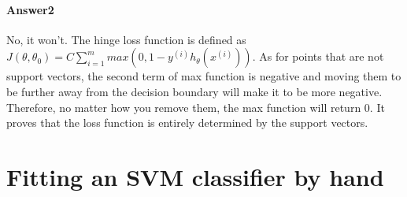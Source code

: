 \documentclass[paper=a4, fontsize=11pt]{scrartcl} %
\numberwithin{equation}{section} %
\numberwithin{figure}{section} %
\numberwithin{table}{section} %
\begin{document}
\paragraph{\textbf{Answer2}}
No, it won't. The hinge loss function is defined as $J\left ( \theta ,\theta _{0} \right )=C\sum_{i=1}^{m}max\left ( 0,1-y^{\left ( i \right )}h_{\theta }\left ( x^{\left ( i \right )} \right ) \right )$. As for points that are not support vectors, the second term of max function is negative and moving them to be further away from the decision boundary will make it to be more negative. Therefore, no matter how you remove them, the max function will return 0. It proves that the loss function is entirely determined by the support vectors.

\section{Fitting an SVM classifier by hand}
\end{document}
